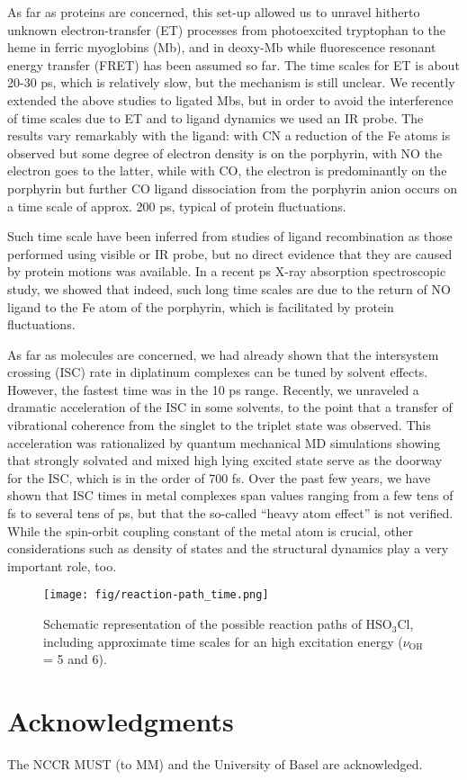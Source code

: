 \documentclass[journal=jacsat,manuscript=article]{achemso}
\begin{document}
As far as proteins are concerned, this set-up allowed us to unravel
hitherto unknown electron-transfer (ET) processes from photoexcited
tryptophan to the heme in ferric myoglobins (Mb),\cite{consani:2013}
and in deoxy-Mb\cite{monni:2015} while fluorescence resonant energy
transfer (FRET) has been assumed so far. The time scales for ET is
about 20-30 ps, which is relatively slow, but the mechanism is still
unclear. We recently extended the above studies to ligated Mbs, but in
order to avoid the interference of time scales due to ET and to ligand
dynamics we used an IR probe. The results vary remarkably with the
ligand: with CN a reduction of the Fe atoms is observed but some
degree of electron density is on the porphyrin, with NO the electron
goes to the latter, while with CO, the electron is predominantly on
the porphyrin but further CO ligand dissociation from the porphyrin
anion occurs on a time scale of approx. 200 ps, typical of protein
fluctuations.\cite{monni:prep}

Such time scale have been inferred from studies of ligand
recombination as those performed using visible or IR probe, but no
direct evidence that they are caused by protein motions was
available. In a recent ps X-ray absorption spectroscopic study, we
showed that indeed, such long time scales are due to the return of NO
ligand to the Fe atom of the porphyrin,\cite{silatani:2015} which is
facilitated by protein fluctuations.

As far as molecules are concerned, we had already shown that the
intersystem crossing (ISC) rate in diplatinum complexes can be tuned
by solvent effects.\cite{chergui.jacs.2011} However, the fastest time
was in the 10 ps range. Recently, we unraveled a dramatic acceleration
of the ISC in some solvents, to the point that a transfer of
vibrational coherence from the singlet to the triplet state was
observed.\cite{monni:2017,monni:rev} This acceleration was
rationalized by quantum mechanical MD simulations showing that
strongly solvated and mixed high lying excited state serve as the
doorway for the ISC, which is in the order of 700 fs. Over the past
few years, we have shown that ISC times in metal complexes span values
ranging from a few tens of fs to several tens of ps, but that the
so-called “heavy atom effect” is not verified. While the spin-orbit
coupling constant of the metal atom is crucial, other considerations
such as density of states and the structural dynamics play a very
important role, too.\cite{chergui:2012,chergui:2015}


\begin{figure}
\texttt{[image: fig/reaction-path\_time.png]}
\caption{Schematic representation of the possible reaction paths of HSO$_3$Cl, including approximate time scales for an high excitation energy ($\nu_{\text{OH}}$ = 5 and 6).}
\label{fig:vibphotodis}
\end{figure} 
    
\section*{Acknowledgments}
The NCCR MUST (to MM) and the University of Basel are acknowledged.



\end{document}

